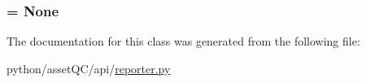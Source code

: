 \hypertarget{classassetQC_1_1api_1_1reporter_1_1Reporter_a8c2e20a2bd9879bd2229ef6e35e96fa9}{
\subsubsection[{priority}]{ = \-None}}\label{d6/d7a/classassetQC_1_1api_1_1reporter_1_1Reporter_a8c2e20a2bd9879bd2229ef6e35e96fa9}


\-The documentation for this class was generated from the following file\-:\begin{DoxyCompactItemize}
\item 
python/asset\-Q\-C/api/\hyperlink{reporter_8py}{reporter.\-py}\end{DoxyCompactItemize}

